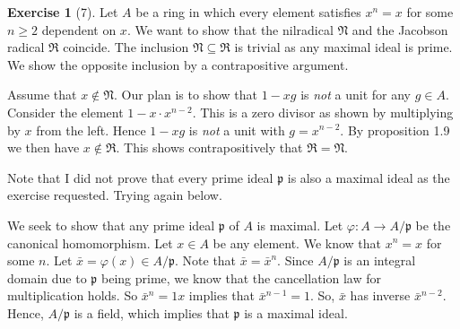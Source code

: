 \documentclass{article}
\theoremstyle{definition}
\newtheorem*{exercise}{Exercise}
\begin{document}
\begin{exercise}[7] Let $A$ be a ring in which every element satisfies
	$x^n = x$ for some $n \geq 2$ dependent on $x$. We want to show
	that the nilradical $\mathfrak{N}$ and the Jacobson radical
	$\mathfrak{R}$ coincide.  The inclusion $\mathfrak{N} \subseteq
	\mathfrak{R}$ is trivial as any maximal ideal is prime. We show
	the opposite inclusion by a contrapositive argument.

	Assume that $x \notin \mathfrak{N}$. Our plan is to show that $1 -
	xg$ is \emph{not} a unit for any $g \in A$. Consider the element
	$1 - x \cdot x^{n-2}$. This is a zero divisor as shown by
	multiplying by $x$ from the left. Hence $1 - xg$ is \emph{not} a
	unit with $g = x^{n-2}$. By proposition 1.9 we then have $x \notin
	\mathfrak{R}$. This shows contrapositively that $\mathfrak{R} =
	\mathfrak{N}$.

	\textcolor{red!30}{Note that I did not prove that every prime
	ideal $\mathfrak{p}$ is also a maximal ideal as the exercise
	requested. Trying again below.}
	
	We seek to show that any prime ideal $\mathfrak{p}$ of $A$ is
	maximal. Let $\varphi : A \to A / \mathfrak{p}$ be the canonical
	homomorphism. Let $x \in A$ be any element. We know that $x^n = x$
	for some $n$. Let $\bar{x} = \varphi(x) \in A / \mathfrak{p}$.
	Note that $\bar{x} = \bar{x}^n$. Since $A / \mathfrak{p}$ is an
	integral domain due to $\mathfrak{p}$ being prime, we know that
	the cancellation law for multiplication holds. So $\bar{x}^n = 1
	x$ implies that $\bar{x}^{n-1} = 1$. So, $\bar{x}$ has
	inverse $\bar{x}^{n-2}$. Hence, $A / \mathfrak{p}$ is a field,
	which implies that $\mathfrak{p}$ is a maximal ideal.
\end{exercise}
\end{document}
